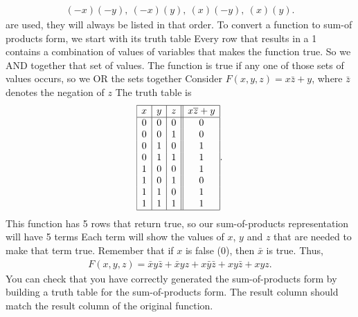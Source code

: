 \documentclass{report}
\begin{document}
\begin{itemize}
\begin{align*}
                (-x)(-y),\ (-x)(y),\ (x)(-y),\ (x)(y)
            .\end{align*}
            are used, they will always be listed in that order.
            \bigbreak \noindent 
            To convert a function to sum-of products form, we start with its truth table
            \bigbreak \noindent 
            Every row that results in a 1 contains a combination of values of variables that makes the function true.
            \bigbreak \noindent 
            So we AND together that set of values.
            \bigbreak \noindent 
             The function is true if any one of those sets of values occurs, so we OR the sets together
             \bigbreak \noindent 
             Consider $F(x,y,z) = x \bar{z} + y$, where $ \bar{z}$ denotes the negation of $z$
             \bigbreak \noindent 
             The truth table is 
             \bigbreak \noindent 
             \begin{align*}
                 \begin{array}{|c|c|c||c|}
                     \hline
                     x & y & z & x\overline{z} + y \\
                     \hline
                     0 & 0 & 0 & 0 \\
                     0 & 0 & 1 & 0 \\
                     0 & 1 & 0 & 1 \\
                     0 & 1 & 1 & 1 \\
                     1 & 0 & 0 & 1 \\
                     1 & 0 & 1 & 0 \\
                     1 & 1 & 0 & 1 \\
                     1 & 1 & 1 & 1 \\
                     \hline
                 \end{array}
             .\end{align*}
             \bigbreak \noindent 
             This function has 5 rows that return true, so our sum-of-products representation will have 5 terms
             \bigbreak \noindent 
             Each term will show the values of $x$, $y$ and $z$ that are needed to make that term true. Remember that if $x$ is false (0), then $\bar{x}$ is true.
             \bigbreak \noindent 
             Thus, 
             \begin{align*}
                 F(x,y,z) = \bar{x}y \bar{z} + \bar{x}yz + x \bar{y} \bar{z} + xy \bar{z} + xyz
             .\end{align*}
             \bigbreak \noindent 
             You can check that you have correctly generated the sum-of-products form by building a truth table for the sum-of-products form. The result column should match the result column of the original function.
    \end{itemize}
\end{document}
